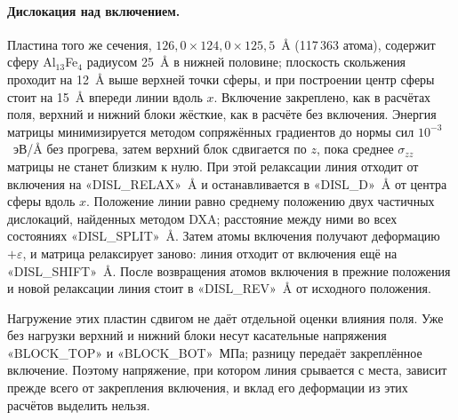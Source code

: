 \paragraph{Дислокация над включением.} Пластина того же сечения,
$126{,}0\times124{,}0\times125{,}5$~\AA{} (117\,363 атома), содержит сферу
Al$_{13}$Fe$_4$ радиусом 25~\AA{} в нижней половине; плоскость скольжения
проходит на 12~\AA{} выше верхней точки сферы, и при построении центр сферы
стоит на 15~\AA{} впереди линии вдоль $x$. Включение закреплено, как в
расчётах поля, верхний и нижний блоки жёсткие, как в расчёте без включения.
Энергия матрицы минимизируется методом сопряжённых градиентов до нормы сил
$10^{-3}$~эВ/\AA{} без прогрева, затем верхний блок
сдвигается по $z$, пока среднее $\sigma_{zz}$ матрицы не станет близким
к нулю. При этой релаксации линия отходит от включения на «DISL_RELAX»~\AA{}
и останавливается в «DISL_D»~\AA{} от центра сферы вдоль $x$. Положение линии
равно среднему положению двух частичных дислокаций, найденных методом DXA;
расстояние между ними во всех состояниях «DISL_SPLIT»~\AA. Затем атомы включения
получают деформацию $+\varepsilon$, и матрица релаксирует заново: линия
отходит от включения ещё на «DISL_SHIFT»~\AA. После возвращения атомов
включения в прежние положения и новой релаксации линия стоит в «DISL_REV»~\AA{}
от исходного положения.

Нагружение этих пластин сдвигом не даёт отдельной оценки влияния поля.
Уже без нагрузки верхний и нижний блоки несут касательные напряжения
«BLOCK_TOP» и «BLOCK_BOT»~МПа; разницу передаёт закреплённое включение.
Поэтому напряжение, при котором линия срывается с места, зависит прежде всего
от закрепления включения, и вклад его деформации из этих расчётов выделить нельзя.
